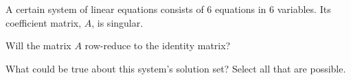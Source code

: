 \documentclass{ximera}
\begin{document}
\begin{exercise}
  A certain system of linear equations consists of 6 equations in 6
  variables.  Its coefficient matrix, $A$, is singular.

  Will the matrix $A$ row-reduce to the identity matrix?

  \begin{multipleChoice}
  \end{multipleChoice}

  What could be true about this system's solution set?  Select all that
  are possible.
  \begin{selectAll}
  \end{selectAll}
\end{exercise}
\end{document}
